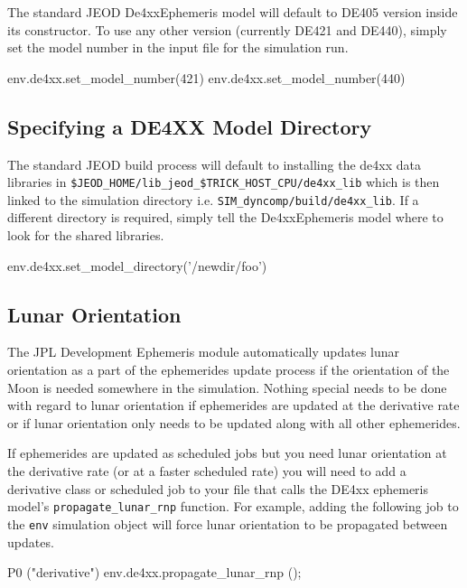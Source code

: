 The standard JEOD De4xxEphemeris model will default to DE405 version
inside its constructor. To use any other version (currently DE421 and DE440), 
simply set the model number in the input file for the simulation run.

\begin{codeblock}
env.de4xx.set_model_number(421)
env.de4xx.set_model_number(440)
\end{codeblock}

\subsection{Specifying a DE4XX Model Directory}
\label{sec:guide_de4xx_directory}

The standard JEOD build process will default to installing the de4xx data libraries
in \newline \verb|$JEOD_HOME/lib_jeod_$TRICK_HOST_CPU/de4xx_lib| which is then linked to the simulation 
directory i.e. \verb|SIM_dyncomp/build/de4xx_lib|. If a different directory is required, simply tell 
the De4xxEphemeris model where to look for the shared libraries.

\begin{codeblock}
env.de4xx.set_model_directory('/newdir/foo')
\end{codeblock}



\subsection{Lunar Orientation}
\label{sec:guide_lunar_rnp}
The JPL Development Ephemeris module automatically updates lunar orientation
as a part of the ephemerides update process if the orientation of the Moon is
needed somewhere in the simulation. Nothing special needs to be done
with regard to lunar orientation if ephemerides are updated at the derivative
rate or if lunar orientation only needs to be updated along with all
other ephemerides.

If ephemerides are updated as scheduled jobs but you need lunar orientation at
the derivative rate (or at a faster scheduled rate) you will need to
add a derivative class or scheduled job to your \Sdefine file that calls
the DE4xx ephemeris model's \verb|propagate_lunar_rnp| function.
For example, adding the following job to the \verb|env| simulation object
will force lunar orientation to be propagated between updates.
\begin{codeblock}
   P0 ("derivative") env.de4xx.propagate_lunar_rnp ();
\end{codeblock}

